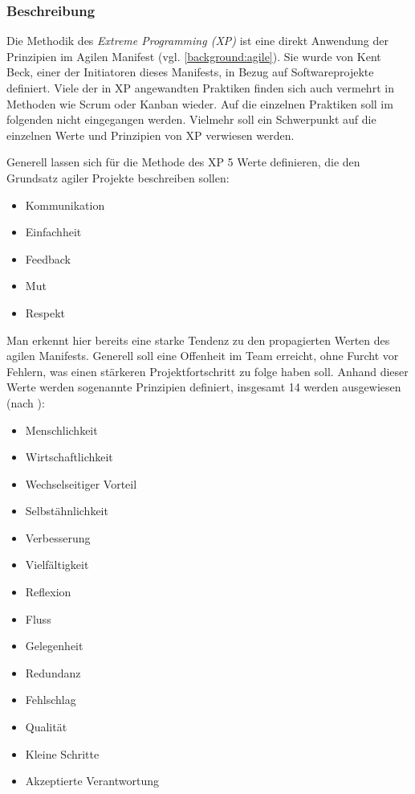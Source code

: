 \subsubsection{Beschreibung}

Die Methodik des \textit{Extreme Programming (XP)} ist eine direkt Anwendung der Prinzipien im Agilen Manifest (vgl. \ref{background:agile}). Sie wurde von Kent Beck, einer der Initiatoren dieses Manifests, in Bezug auf Softwareprojekte definiert. \cite[S. 13]{hanser_agile_2010} Viele der in XP angewandten Praktiken finden sich auch vermehrt in Methoden wie Scrum oder Kanban wieder. Auf die einzelnen Praktiken soll im folgenden nicht eingegangen werden. Vielmehr soll ein Schwerpunkt auf die einzelnen Werte und Prinzipien von XP verwiesen werden.

Generell lassen sich für die Methode des XP 5 Werte definieren, die den Grundsatz agiler Projekte beschreiben sollen:

\begin{itemize}[noitemsep, topsep=0pt]
	\item Kommunikation
	\item Einfachheit
	\item Feedback
	\item Mut
	\item Respekt
\end{itemize}

Man erkennt hier bereits eine starke Tendenz zu den propagierten Werten des agilen Manifests. Generell soll eine Offenheit im Team erreicht, ohne Furcht vor Fehlern, was einen stärkeren Projektfortschritt zu folge haben soll. Anhand dieser Werte werden sogenannte Prinzipien definiert, insgesamt 14 werden ausgewiesen (nach ):

\begin{itemize}[noitemsep, topsep=0pt]
	\item Menschlichkeit
	\item Wirtschaftlichkeit
	\item Wechselseitiger Vorteil
	\item Selbstähnlichkeit
	\item Verbesserung
	\item Vielfältigkeit
	\item Reflexion
	\item Fluss
	\item Gelegenheit
	\item Redundanz
	\item Fehlschlag
	\item Qualität
	\item Kleine Schritte
	\item Akzeptierte Verantwortung
\end{itemize}

